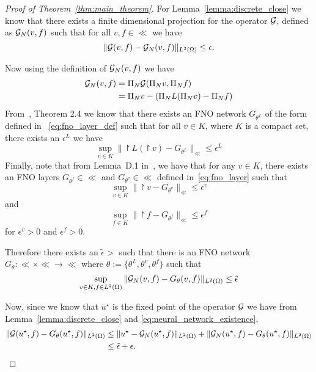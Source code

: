 \begin{proof}[Proof of Theorem~\ref{thm:main_theorem}]
    For Lemma~\ref{lemma:discrete_close}
    we know that there exists a finite dimensional 
    projection for the operator ${\mathcal{G}}$, defined as ${\mathcal{G}}_N(v, f)$ such that 
    for all $v, f \in \ll$ we have
    $$\|{\mathcal{G}}(v, f) - {\mathcal{G}}_N(v, f)\|_{L^2(\Omega)} \leq \epsilon.$$

    Now using the definition of ${\mathcal{G}}_N(v, f)$ we have
    \begin{align*}
        {\mathcal{G}}_N(v, f) &= \Pi_N{\mathcal{G}}(\Pi_N v, \Pi_N f)\\
        &= \Pi_N v - \left(\Pi_N L(\Pi_N v) - \Pi_N f\right)
    \end{align*}
    From~\citet{kovachki2021universal}, Theorem 2.4 we know 
    that there exists an FNO network $G_{\theta^L}$ 
    of the form defined in 
    ~\eqref{eq:fno_layer_def} such that 
    for all $v \in K$, where $K$ is a compact set, 
    there exists an $\epsilon^L$
    we have
    \begin{equation}
    \sup_{v \in K} \|\project L(\project v) - G_{\theta^L}\|_{\ll} \leq 
        \epsilon^L
    \end{equation}
    Finally, 
    note that from Lemma~D.1 in~\cite{kovachki2021universal},
    we have
    that for any $v \in K$, 
    there exists an FNO layers
    $G_{\theta^f} \in \ll$ and $G_{\theta^v} \in \ll$ defined 
    in~\eqref{eq:fno_layer}
    such that
    \begin{equation}
    \sup_{v \in K} \|\project v - G_{\theta^v}\|_{\ll} \leq 
        \epsilon^v
    \end{equation}
    and 
    \begin{equation}
    \sup_{f \in K} \|\project f - G_{\theta^f}\|_{\ll} \leq 
        \epsilon^f
    \end{equation}
    for $\epsilon^v > 0$ and $\epsilon^f > 0$.


    Therefore there exists an $\tilde{\epsilon} > $ 
    such that there is an FNO network
    $G_\theta: \ll \times \ll \to \ll$
    where $\theta := \{\theta^L, \theta^v, \theta^f\}$
    such that
    \begin{equation}
        \label{eq:neural_network_existence}
        \sup_{v \in K, f \in L^2(\Omega)} 
            \|{\mathcal{G}}_N(v, f) - G_\theta(v, f)\|_{L^2(\Omega)} \leq 
            \tilde{\epsilon}
    \end{equation}


    Now, since we know that $u^\star$ is the fixed point 
    of the operator ${\mathcal{G}}$ we have from Lemma~\ref{lemma:discrete_close} and \eqref{eq:neural_network_existence},
    \begin{align*}
        \|{\mathcal{G}}(u^\star, f) - G_\theta(u^\star, f)\|_{L^2(\Omega)} 
        &\leq \|u^\star - {\mathcal{G}}_N(u^\star, f)\|_{L^2(\Omega)} 
            + \|{\mathcal{G}}_N(u^\star, f) -  G_\theta(u^\star, f)\|_{L^2(\Omega)}\\
        &\leq \tilde{\epsilon} + \epsilon.
    \end{align*}
\end{proof}

